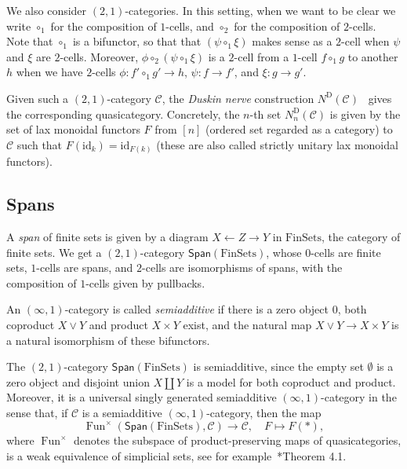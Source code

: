 \documentclass[a4paper,reqno]{amsart}
\theoremstyle{plain}
\theoremstyle{definition}
\theoremstyle{remark}
\numberwithin{equation}{section}
\newcommand{\cC}{\mathcal{C}}
\newcommand{\Span}{\mathsf{Span}}
\newcommand{\FinSets}{\mathrm{FinSets}}
\newcommand{\id}{\mathrm{id}}
\newcommand{\ND}{N^{\mathrm{D}}}
\DeclareMathOperator{\Fun}{Fun}
\begin{document}
We also consider $(2, 1)$-categories.
In this setting, when we want to be clear we write $\circ_1$ for the composition of $1$-cells, and $\circ_2$ for the composition of $2$-cells. Note that $\circ_1$ is a bifunctor, so that that $(\psi \circ_1 \xi)$ makes sense as a $2$-cell when $\psi$ and $\xi$ are $2$-cells. Moreover, $\phi \circ_2 (\psi \circ_1 \xi)$ is a $2$-cell from a $1$-cell $f \circ_1 g$ to another $h$ when we have $2$-cells $\phi \colon f' \circ_1 g' \to h$, $\psi \colon f \to f'$, and $\xi \colon g \to g'$.

Given such a $(2,1)$-category $\cC$, the \emph{Duskin nerve} construction $\ND(\cC)$~ gives the corresponding quasicategory.
Concretely, the $n$-th set $\ND_n(\cC)$ is given by the set of lax monoidal functors $F$ from  $[n]$ (ordered set regarded as a category) to $\cC$ such that $F(\id_k) = \id_{F(k)}$ (these are also called strictly unitary lax monoidal functors).


\subsection{Spans}%

A \emph{span} of finite sets is given by a diagram $X \leftarrow Z \rightarrow Y$ in $\FinSets$, the category of finite sets.
We get a $(2, 1)$-category $\Span(\FinSets)$, whose $0$-cells are finite sets, $1$-cells are spans, and $2$-cells are isomorphisms of spans, with the composition of $1$-cells given by pullbacks.

An $(\infty, 1)$-category is called \emph{semiadditive} if there is a zero object $0$, both coproduct $X \vee Y$ and product $X \times Y$ exist, and the natural map $X \vee Y \to X \times Y$ is a natural isomorphism of these bifunctors.

The $(2, 1)$-category $\Span(\FinSets)$ is semiadditive, since the empty set $\emptyset$ is a zero object and disjoint union $X \coprod Y$ is a model for both coproduct and product.
Moreover, it is a universal singly generated semiadditive $(\infty, 1)$-category in the sense that, if $\cC$ is a semiadditive $(\infty, 1)$-category, then the map
\begin{equation}\label{eq:semiadditive-cat-functor-eval}
\Fun^\times(\Span(\FinSets), \cC) \to \cC, \quad F \mapsto F(*),
\end{equation}
where $\Fun^\times$ denotes the subspace of product-preserving maps of quasicategories, is a weak equivalence of simplicial sets, see for example~\cite{harp:amb}*{Theorem 4.1}.
\end{document}
